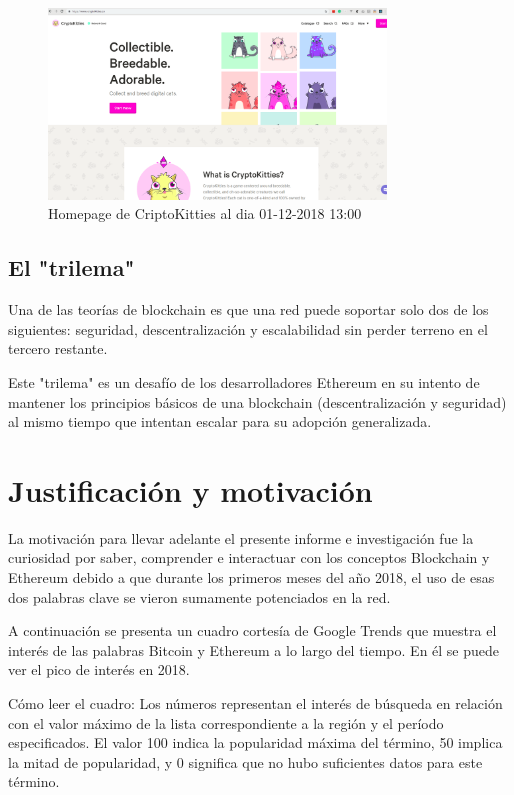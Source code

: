 \begin{figure}[htbp!] 
\centering    
\includegraphics[width=0.8\textwidth]{criptokittieshome}
\caption[CriptoKitties]{Homepage de CriptoKitties al dia 01-12-2018 13:00}
\label{fig:criptokitties-home}
\end{figure}

\subsection{El "trilema"}
Una de las teorías de blockchain es que una red puede soportar solo dos de los siguientes:
seguridad, descentralización y escalabilidad sin perder terreno en el tercero restante.

Este "trilema" es un desafío de los desarrolladores Ethereum en su intento de mantener los
principios
básicos de una blockchain (descentralización y seguridad) al mismo tiempo que intentan escalar para
su adopción generalizada.



\section{Justificación y motivación} %
La motivación para llevar adelante el presente informe e investigación fue la curiosidad por saber,
comprender e interactuar con los conceptos Blockchain y Ethereum debido a que durante los primeros
meses del año 2018, el uso de esas dos palabras clave se vieron sumamente potenciados en la red. 

A continuación se presenta un cuadro cortesía de Google Trends que muestra el interés de las 
palabras Bitcoin y Ethereum a lo largo del tiempo. En él se puede ver el pico de interés en 2018.

Cómo leer el cuadro: Los números representan el interés de búsqueda en relación con el valor máximo
de la lista correspondiente a la región y el período especificados. El valor 100 indica la
popularidad máxima del término, 50 implica la mitad de popularidad, y 0 significa que no hubo
suficientes datos para este término.

